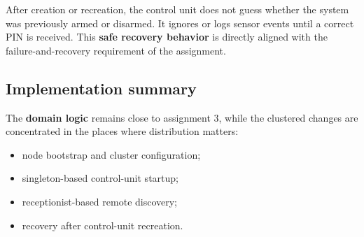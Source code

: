 After creation or recreation, the control unit does not guess whether the
system was previously armed or disarmed. It ignores or logs sensor events
until a correct PIN is received. This \textbf{safe recovery behavior} is directly
aligned with the failure-and-recovery requirement of the assignment.

\subsection{Implementation summary}

The \textbf{domain logic} remains close to assignment 3, while the clustered
changes are concentrated in the places where distribution matters:
\begin{itemize}
    \item node bootstrap and cluster configuration;
    \item singleton-based control-unit startup;
    \item receptionist-based remote discovery;
    \item recovery after control-unit recreation.
\end{itemize}
